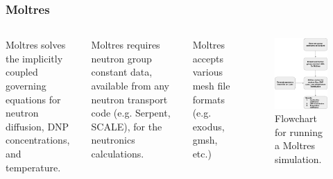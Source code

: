 \begin{frame}
	\frametitle{Moltres}
	\begin{columns}
		\column{5cm}
		Moltres solves the implicitly coupled governing equations for
		neutron diffusion, \gls{DNP} concentrations, and
		temperature.
		
		\vspace{.2cm}
		Moltres requires neutron group constant data, available from any neutron
		transport code (e.g. Serpent, SCALE), for the neutronics calculations.
		
		\vspace{.2cm}
		Moltres accepts various mesh file formats (e.g. exodus, gmsh, etc.)
		\column{5cm}
		\begin{figure}
			\centering
			\includegraphics[width=.9\textwidth]{./images/flowchart}
			\caption{Flowchart for running a Moltres simulation.}
			\label{fig:flowchart}
		\end{figure}
	\end{columns}
\end{frame}

